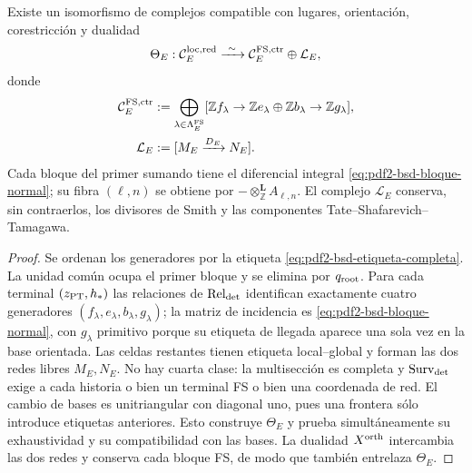 \begin{theorem}
\label{thm:pdf2-bsd-descomposicion-global}
Existe un isomorfismo de complejos compatible con lugares, orientación,
corestricción y dualidad
\begin{equation}\label{eq:pdf2-bsd-descomposicion-global}
 \Theta_E:\mathcal C_E^{\rm loc,red}
 \xrightarrow{\ \sim\ }
 \mathcal C_E^{\rm FS,ctr}\oplus\mathcal L_E,
\end{equation}
donde
\begin{equation}\label{eq:pdf2-bsd-sumando-fs-y-lattice}
 \begin{aligned}
 \mathcal C_E^{\rm FS,ctr}
  &:=\bigoplus_{\lambda\in\Lambda_E^{\rm FS}}
   [\mathbb Zf_\lambda\to
    \mathbb Ze_\lambda\oplus\mathbb Zb_\lambda
                    \to\mathbb Zg_\lambda],\\
 \mathcal L_E&:=[M_E\xrightarrow{D_E}N_E].
 \end{aligned}
\end{equation}
Cada bloque del primer sumando tiene el diferencial integral
\eqref{eq:pdf2-bsd-bloque-normal}; su fibra $(\ell,n)$ se obtiene por
$-\otimes_{\mathbb Z}^{\mathbf L}A_{\ell,n}$. El complejo $\mathcal L_E$
conserva, sin
contraerlos, los divisores de Smith y las componentes
Tate--Shafarevich--Tamagawa.
\end{theorem}

\begin{proof}
Se ordenan los generadores por la etiqueta
\eqref{eq:pdf2-bsd-etiqueta-completa}. La unidad común ocupa el primer
bloque y se elimina por $q_{\rm root}$. Para cada terminal
$(z_{\rm PT},h_*)$ las relaciones de $\operatorname{Rel}_{\rm det}$
identifican exactamente cuatro generadores
$(f_\lambda,e_\lambda,b_\lambda,g_\lambda)$; la matriz de incidencia es
\eqref{eq:pdf2-bsd-bloque-normal}, con $g_\lambda$ primitivo porque su
etiqueta de llegada aparece una sola vez en la base orientada. Las celdas
restantes tienen etiqueta local--global y forman las dos redes libres
$M_E,N_E$. No hay cuarta clase: la multisección es completa y
$\operatorname{Surv}_{\rm det}$ exige a cada historia o bien un terminal
FS o bien una coordenada de red. El cambio de bases es unitriangular con
diagonal uno, pues una frontera sólo introduce etiquetas anteriores. Esto
construye $\Theta_E$ y prueba simultáneamente su exhaustividad y su
compatibilidad con las bases. La dualidad $X^{\rm orth}$ intercambia las
dos redes y conserva cada bloque FS, de modo que también entrelaza
$\Theta_E$.
\end{proof}

